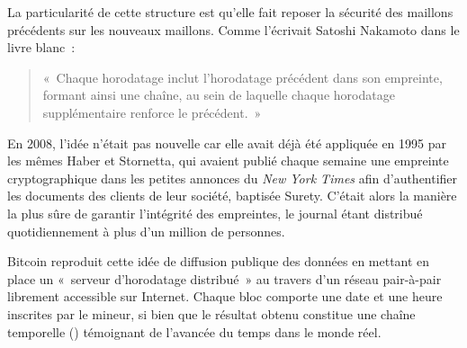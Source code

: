 La particularité de cette structure est qu'elle fait reposer la sécurité des maillons précédents sur les nouveaux maillons. Comme l'écrivait Satoshi Nakamoto dans le livre blanc~: 

\begin{quote}
«~Chaque horodatage inclut l'horodatage précédent dans son empreinte, formant ainsi une chaîne, au sein de laquelle chaque horodatage supplémentaire renforce le précédent.~»
\end{quote}

En 2008, l'idée n'était pas nouvelle car elle avait déjà été appliquée en 1995 par les mêmes Haber et Stornetta, qui avaient publié chaque semaine une empreinte cryptographique dans les petites annonces du \emph{New York Times} afin d'authentifier les documents des clients de leur société, baptisée Surety. C'était alors la manière la plus sûre de garantir l'intégrité des empreintes, le journal étant distribué quotidiennement à plus d'un million de personnes.


Bitcoin reproduit cette idée de diffusion publique des données en mettant en place un «~serveur d'horodatage distribué~» au travers d'un réseau pair-à-pair librement accessible sur Internet. Chaque bloc comporte une date et une heure inscrites par le mineur, si bien que le résultat obtenu constitue une chaîne temporelle () témoignant de l'avancée du temps dans le monde réel.

